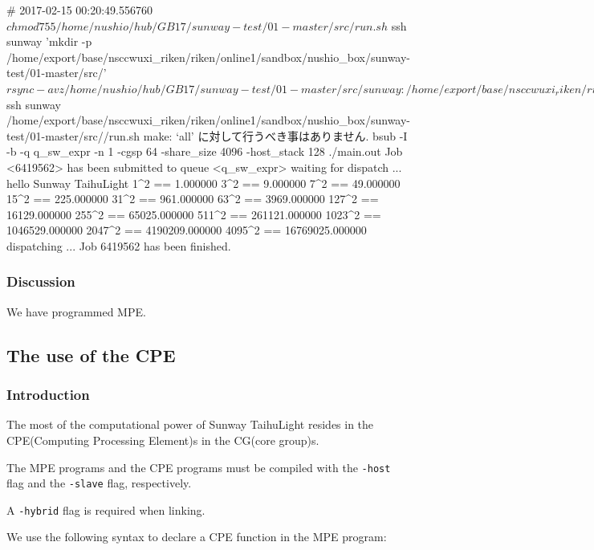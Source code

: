 \begin{code}
# 2017-02-15 00:20:49.556760
$ chmod 755 /home/nushio/hub/GB17/sunway-test/01-master/src/run.sh
$ ssh sunway 'mkdir -p /home/export/base/nsccwuxi_riken/riken/online1/sandbox/nushio_box/sunway-test/01-master/src/'
$ rsync -avz /home/nushio/hub/GB17/sunway-test/01-master/src/ sunway:/home/export/base/nsccwuxi_riken/riken/online1/sandbox/nushio_box/sunway-test/01-master/src/
sending incremental file list
./
Makefile
run.sh

sent 436 bytes  received 72 bytes  145.14 bytes/sec
total size is 955  speedup is 1.88
$ ssh sunway /home/export/base/nsccwuxi_riken/riken/online1/sandbox/nushio_box/sunway-test/01-master/src//run.sh
make: `all' に対して行うべき事はありません.
bsub -I -b -q q_sw_expr -n 1 -cgsp 64 -share_size 4096 -host_stack 128 ./main.out
Job <6419562> has been submitted to queue <q_sw_expr>
waiting for dispatch ...
hello Sunway TaihuLight
1^2 == 1.000000
3^2 == 9.000000
7^2 == 49.000000
15^2 == 225.000000
31^2 == 961.000000
63^2 == 3969.000000
127^2 == 16129.000000
255^2 == 65025.000000
511^2 == 261121.000000
1023^2 == 1046529.000000
2047^2 == 4190209.000000
4095^2 == 16769025.000000
dispatching ...
Job 6419562 has been finished.

\end{code}

\subsubsection{Discussion}

We have programmed MPE.


\subsection{The use of the CPE}
\subsubsection{Introduction}

The most of the computational power of Sunway TaihuLight resides in the
CPE(Computing Processing Element)s in the
CG(core group)s.


The MPE programs and the CPE programs must be compiled with
the \verb`-host` flag and
the \verb`-slave` flag, respectively.

A
\verb`-hybrid`
flag is required when linking.

We use the following syntax
to declare a
CPE function in the
MPE program:


